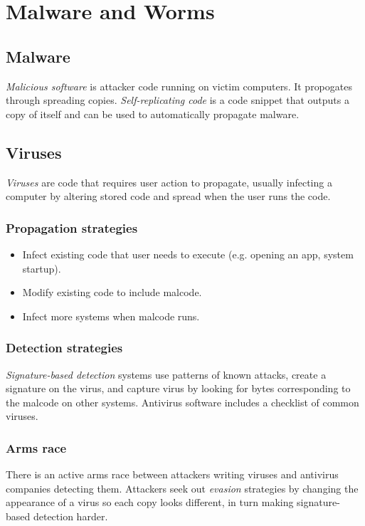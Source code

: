 \chapter{Malware and Worms}

\section{Malware}
\emph{Malicious software} is attacker code running on victim computers. It propogates through spreading copies. \emph{Self-replicating code} is a code snippet that outputs a copy of itself and can be used to automatically propagate malware.

\section{Viruses}
\emph{Viruses} are code that requires user action to propagate, usually infecting a computer by altering stored code and spread when the user runs the code.

\subsection{Propagation strategies}
\begin{itemize}
    \item Infect existing code that user needs to execute (e.g. opening an app, system startup).
    \item Modify existing code to include malcode.
    \item Infect more systems when malcode runs.
\end{itemize}

\subsection{Detection strategies}
\emph{Signature-based detection} systems use patterns of known attacks, create a signature on the virus, and capture virus by looking for bytes corresponding to the malcode on other systems. Antivirus software includes a checklist of common viruses.

\subsection{Arms race}
There is an active arms race between attackers writing viruses and antivirus companies detecting them. Attackers seek out \emph{evasion} strategies by changing the appearance of a virus so each copy looks different, in turn making signature-based detection harder.

